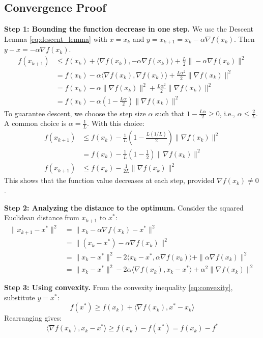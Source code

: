 \documentclass{article}
\newcommand{\norm}[1]{\|#1\|}          %
\newcommand{\ip}[2]{\langle #1, #2 \rangle} %
\newcommand{\grad}{\nabla}             %
\begin{document}
\subsection*{Convergence Proof}

\textbf{Step 1: Bounding the function decrease in one step.}
We use the Descent Lemma \eqref{eq:descent_lemma} with $x = x_k$ and $y = x_{k+1} = x_k - \alpha \grad f(x_k)$. Then $y - x = -\alpha \grad f(x_k)$.
\begin{align*}
    f(x_{k+1}) &\le f(x_k) + \ip{\grad f(x_k)}{-\alpha \grad f(x_k)} + \frac{L}{2} \norm{-\alpha \grad f(x_k)}^2 \\
    &= f(x_k) - \alpha \ip{\grad f(x_k)}{\grad f(x_k)} + \frac{L \alpha^2}{2} \norm{\grad f(x_k)}^2 \\
    &= f(x_k) - \alpha \norm{\grad f(x_k)}^2 + \frac{L \alpha^2}{2} \norm{\grad f(x_k)}^2 \\
    &= f(x_k) - \alpha \left( 1 - \frac{L \alpha}{2} \right) \norm{\grad f(x_k)}^2
\end{align*}
To guarantee descent, we choose the step size $\alpha$ such that $1 - \frac{L \alpha}{2} \ge 0$, i.e., $\alpha \le \frac{2}{L}$. A common choice is $\alpha = \frac{1}{L}$. With this choice:
\begin{align}
    f(x_{k+1}) &\le f(x_k) - \frac{1}{L} \left( 1 - \frac{L (1/L)}{2} \right) \norm{\grad f(x_k)}^2 \nonumber \\
    &= f(x_k) - \frac{1}{L} \left( 1 - \frac{1}{2} \right) \norm{\grad f(x_k)}^2 \nonumber \\
    f(x_{k+1}) &\le f(x_k) - \frac{1}{2 L} \norm{\grad f(x_k)}^2 \label{eq:func_decrease}
\end{align}
This shows that the function value decreases at each step, provided $\grad f(x_k) \neq 0$.

\textbf{Step 2: Analyzing the distance to the optimum.}
Consider the squared Euclidean distance from $x_{k+1}$ to $x^*$:
\begin{align*}
    \norm{x_{k+1} - x^*}^2 &= \norm{x_k - \alpha \grad f(x_k) - x^*}^2 \\
    &= \norm{(x_k - x^*) - \alpha \grad f(x_k)}^2 \\
    &= \norm{x_k - x^*}^2 - 2 \ip{x_k - x^*}{\alpha \grad f(x_k)} + \norm{\alpha \grad f(x_k)}^2 \\
    &= \norm{x_k - x^*}^2 - 2 \alpha \ip{\grad f(x_k)}{x_k - x^*} + \alpha^2 \norm{\grad f(x_k)}^2
\end{align*}

\textbf{Step 3: Using convexity.}
From the convexity inequality \eqref{eq:convexity}, substitute $y = x^*$:
\begin{equation*}
    f(x^*) \ge f(x_k) + \ip{\grad f(x_k)}{x^* - x_k}
\end{equation*}
Rearranging gives:
\begin{equation} \label{eq:convex_for_dist}
    \ip{\grad f(x_k)}{x_k - x^*} \ge f(x_k) - f(x^*) = f(x_k) - f^*
\end{equation}
\end{document}
